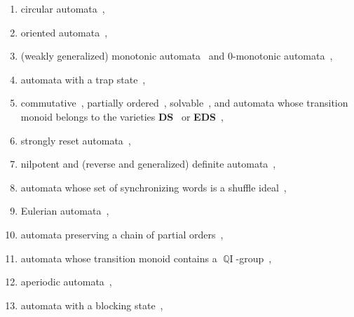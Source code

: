 \begin{enumerate}%
	\item circular automata~\cite{Dubuc96,Dubuc98,DBLP:conf/icalp/Pin78},
	
	\item oriented automata~\cite{Eppstein90}, 
	
	\item (weakly generalized) monotonic automata~\cite{AnanichevVolkov04,DBLP:journals/tcs/AnanichevV04,AnanichevV05}
	and $0$-monotonic automata~\cite{Ananichev2010},
	
	\item automata with a trap state~\cite{DBLP:conf/birthday/Babcsanyi09,Rystsov97},
		
	\item commutative~\cite{DBLP:journals/actaC/ImrehS95,FernauHoffmann19,Rys96}, partially ordered~\cite{Ryzhikov19a}, solvable~\cite{Rystsov97}, and automata whose transition monoid belongs to the varieties \textbf{DS}~\cite{almeida2009representation} or \textbf{EDS}~\cite{AlmeidaS09},
		
	\item strongly reset automata~\cite{Rystsov97}, 
	
	\item nilpotent and (reverse and generalized) definite   automata~\cite{DBLP:journals/actaC/ImrehS95,Rystsov97},
	
	\item automata whose set of synchronizing words is a shuffle ideal~\cite{DBLP:journals/jalc/PetkovicS01},
	
	\item Eulerian automata~\cite{DBLP:journals/tcs/Kari03},
	
	\item automata preserving a chain of partial orders~\cite{DBLP:journals/tcs/Volkov09},
	
	\item automata whose transition monoid contains a $\operatorname{\mathbb{Q} I}$-group~\cite{ArCamSt2017,ArnoldS06},
	
	\item  aperiodic automata~\cite{Trahtman07},
	
	\item automata with a blocking state~\cite{DBLP:conf/birthday/Babcsanyi09},
	

\end{enumerate}
